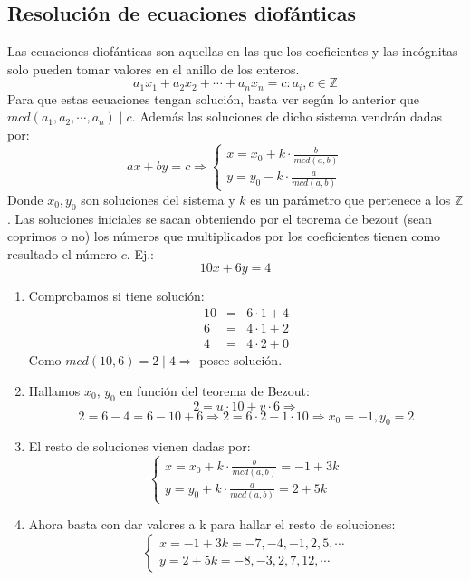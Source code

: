 \documentclass[10pt,a4paper,openright]{book}
\theoremstyle{break}
\begin{document}
\subsection{Resolución de ecuaciones diofánticas}
Las ecuaciones diofánticas son aquellas en las que los coeficientes y las incógnitas solo pueden tomar valores en el anillo de los enteros.
$$a_1x_1+a_2x_2+\cdots+a_nx_n=c : a_i, c\in \mathbb Z$$
Para que estas ecuaciones tengan solución, basta ver según lo anterior que $mcd(a_1,a_2,\cdots,a_n)\mid c$.
Además las soluciones de dicho sistema vendrán dadas por:
$$
ax+by=c\Rightarrow
\begin{cases}
x=x_0+k\cdot\frac{b}{mcd(a,b)} \\
y=y_0-k\cdot \frac{a}{mcd(a,b)} 
\end{cases}
$$
Donde $x_0, y_0$ son soluciones del sistema y $k$ es un parámetro que pertenece a los $\mathbb Z$.
Las soluciones iniciales se sacan obteniendo por el teorema de bezout (sean coprimos o no) los números que multiplicados por los coeficientes tienen como resultado el número $c$.
Ej.:
$$10x+6y=4$$
\begin{enumerate}
\item Comprobamos si tiene solución:
\begin{eqnarray}
10 &=& 6\cdot 1 +4 \\
6  &=& 4\cdot 1 + 2 \\
4  &=& 4\cdot 2 + 0
\end{eqnarray}
Como $mcd(10,6)=2\mid 4 \Rightarrow$ posee solución.

\item Hallamos $x_0$, $y_0$ en función del teorema de Bezout:
$$2=u\cdot 10 + v\cdot 6\Rightarrow$$
$$2=6-4=6-10+6\Rightarrow 2=6\cdot 2 -1\cdot 10\Rightarrow x_0=-1,y_0=2$$

\item El resto de soluciones vienen dadas por:
$$
\begin{cases}
x=x_0+k\cdot\frac{b}{mcd(a,b)}=-1+3k \\
y=y_0+k\cdot \frac{a}{mcd(a,b)}=2+5k
\end{cases}
$$

\item Ahora basta con dar valores a k para hallar el resto de soluciones:
$$
\begin{cases}
x=-1+3k=-7,-4,-1,2, 5,\cdots \\
y=2+5k=-8,-3, 2, 7, 12, \cdots
\end{cases}
$$
\end{enumerate}
\end{document}
